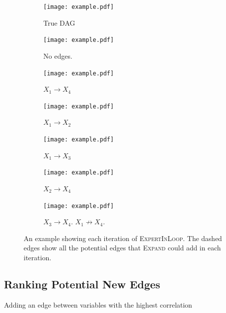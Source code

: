 \documentclass[accepted]{uai2025} %
\begin{document}
\begin{figure}[t!]
	\begin{subfigure}{0.125 \textwidth}
		\centering
		\texttt{[image: example.pdf]}
		\caption{True DAG}
	\end{subfigure}%
	\begin{subfigure}{0.125 \textwidth}
		\centering
		\texttt{[image: example.pdf]}
		\caption{No edges.}
	\end{subfigure}%
	\begin{subfigure}{0.125 \textwidth}
		\centering
		\texttt{[image: example.pdf]}
		\caption{$ X_1 \rightarrow X_4 $}
	\end{subfigure}%
	\begin{subfigure}{0.125 \textwidth}
		\centering
		\texttt{[image: example.pdf]}
		\caption{$ X_1 \rightarrow X_2 $}
	\end{subfigure}
	\begin{subfigure}{0.125 \textwidth}
		\centering
		\texttt{[image: example.pdf]}
		\caption{$ X_1 \rightarrow X_3 $}
	\end{subfigure}%
	\begin{subfigure}{0.125 \textwidth}
		\centering
		\texttt{[image: example.pdf]}
		\caption{$ X_2 \rightarrow X_4 $}
	\end{subfigure}%
	\begin{subfigure}{0.250 \textwidth}
		\centering
		\texttt{[image: example.pdf]}
		\caption{$ X_3 \rightarrow X_4 $. $ X_1 \not \rightarrow X_4 $.}
	\end{subfigure}
	\caption{An example showing each iteration of \textsc{ExpertInLoop}. The dashed edges show all the potential edges that \textsc{Expand} could add in each iteration.}
\end{figure}


\subsection{Ranking Potential New Edges}
\label{sec:ranking}

\begin{algorithm}[h]
\DontPrintSemicolon
\SetAlgoLined
{}
\caption{Adding an edge between variables with the highest correlation}
\label{algo:rankedexpand}
\end{algorithm}
\end{document}
